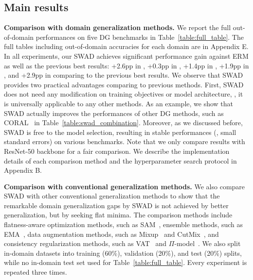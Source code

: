 \subsection{Main results}
\label{label:s__main_results}


\textbf{Comparison with domain generalization methods.}
We report the full out-of-domain performances on five DG benchmarks in Table~\ref{table:full_table}.
The full tables including out-of-domain accuracies for each domain are in Appendix E.
In all experiments, our SWAD achieves significant performance gain against ERM as well as the previous best results: +2.6pp in , +0.3pp in , +1.4pp in , +1.9pp in , and +2.9pp in  comparing to the previous best results.
We observe that SWAD provides two practical advantages comparing to previous methods. First, SWAD does not need any modification on training objectives or model architecture, \ie, it is universally applicable to any other methods.
As an example, we show that SWAD actually improves the performances of other DG methods, such as CORAL~\cite{sun2016coral} in Table~\ref{table:swad_combination}.
Moreover, as we discussed before, SWAD is free to the model selection, resulting in stable performances (\ie, small standard errors) on various benchmarks.
Note that we only compare results with ResNet-50 backbone for a fair comparison.
We describe the implementation details of each comparison method and the hyperparameter search protocol in Appendix B.


\textbf{Comparison with conventional generalization methods.}
We also compare SWAD with other conventional generalization methods to show that the remarkable domain generalization gaps by SWAD is not achieved by better generalization, but by seeking flat minima.
The comparison methods include flatness-aware optimization methods, such as SAM~\cite{foret2020sharpness},
ensemble methods, such as EMA~\cite{polyak1992ema},
data augmentation methods, such as Mixup~\cite{zhang2018mixup} and CutMix~\cite{yun2019cutmix}, and consistency regularization methods, such as VAT~\cite{miyato2018vat} and $\Pi$-model~\cite{LaineA17iclr_pi_model}.
We also split in-domain datasets into training (60\%), validation (20\%), and test (20\%) splits, while no in-domain test set used for Table~\ref{table:full_table}.
Every experiment is repeated three times.


